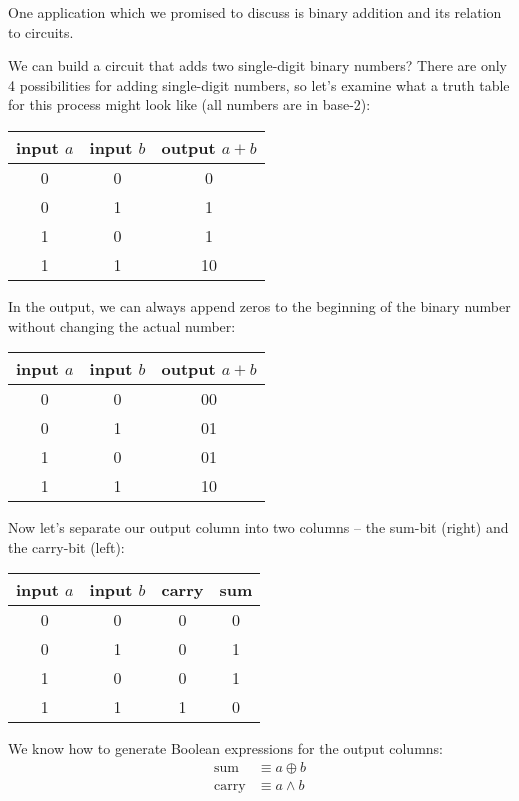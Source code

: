\documentclass[main.tex]{subfiles}
\begin{document}
One application which we promised to discuss is binary addition and its relation to circuits.

We can build a circuit that adds two single-digit binary numbers? There are only 4 possibilities for adding single-digit numbers, so let's examine what a truth table for this process might look like (all numbers are in base-2):
	
\begin{center}
	\begin{tabular}{cc|c}
		input \(a\) & input \(b\) & output \(a + b\) \\
		\midrule
		0 & 0 & 0 \\
		0 & 1 & 1 \\
		1 & 0 & 1 \\
		1 & 1 & 10 \\
	\end{tabular}
\end{center}

In the output, we can always append zeros to the beginning of the binary number without changing the actual number:

\begin{center}
	\begin{tabular}{cc|c}
		input \(a\) & input \(b\) & output \(a + b\) \\
		\midrule
		0 & 0 & 00 \\
		0 & 1 & 01 \\
		1 & 0 & 01 \\
		1 & 1 & 10 \\
	\end{tabular}
\end{center}

Now let's separate our output column into two columns -- the sum-bit (right) and the carry-bit (left):

\begin{center}
	\begin{tabular}{cc|cc}
		input \(a\) & input \(b\) & carry & sum \\
		\midrule
		0 & 0 & 0 & 0 \\
		0 & 1 & 0 & 1 \\
		1 & 0 & 0 & 1 \\
		1 & 1 & 1 & 0 \\
	\end{tabular}
\end{center}

We know how to generate Boolean expressions for the output columns: 
\begin{align*}
\text{sum} &\equiv a \oplus b \\
\text{carry} &\equiv a \land b
\end{align*}
\end{document}

